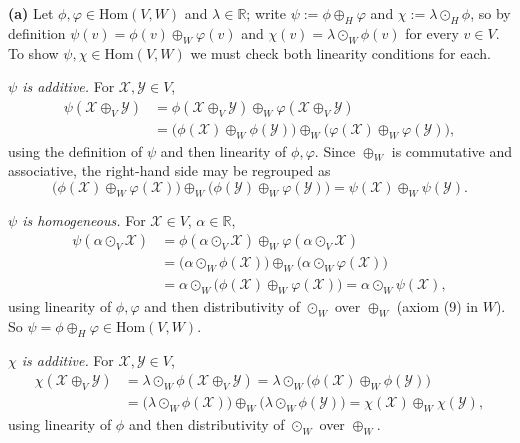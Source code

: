 \documentclass[11pt]{article}
\begin{document}
\textbf{(a)} Let $\phi,\varphi\in\mathrm{Hom}(V,W)$ and $\lambda\in\mathbb R$; write $\psi:=\phi\oplus_H\varphi$ and $\chi:=\lambda\odot_H\phi$, so by definition $\psi(v)=\phi(v)\oplus_W\varphi(v)$ and $\chi(v)=\lambda\odot_W\phi(v)$ for every $v\in V$. To show $\psi,\chi\in\mathrm{Hom}(V,W)$ we must check both linearity conditions for each.

\emph{$\psi$ is additive.} For $\mathcal X,\mathcal Y\in V$,
\begin{align*}
\psi(\mathcal X\oplus_V\mathcal Y) &= \phi(\mathcal X\oplus_V\mathcal Y)\oplus_W\varphi(\mathcal X\oplus_V\mathcal Y) \\
&= \big(\phi(\mathcal X)\oplus_W\phi(\mathcal Y)\big)\oplus_W\big(\varphi(\mathcal X)\oplus_W\varphi(\mathcal Y)\big),
\end{align*}
using the definition of $\psi$ and then linearity of $\phi,\varphi$. Since $\oplus_W$ is commutative and associative, the right-hand side may be regrouped as
\[
\big(\phi(\mathcal X)\oplus_W\varphi(\mathcal X)\big)\oplus_W\big(\phi(\mathcal Y)\oplus_W\varphi(\mathcal Y)\big) = \psi(\mathcal X)\oplus_W\psi(\mathcal Y).
\]

\emph{$\psi$ is homogeneous.} For $\mathcal X\in V$, $\alpha\in\mathbb R$,
\begin{align*}
\psi(\alpha\odot_V\mathcal X) &= \phi(\alpha\odot_V\mathcal X)\oplus_W\varphi(\alpha\odot_V\mathcal X) \\
&= \big(\alpha\odot_W\phi(\mathcal X)\big)\oplus_W\big(\alpha\odot_W\varphi(\mathcal X)\big) \\
&= \alpha\odot_W\big(\phi(\mathcal X)\oplus_W\varphi(\mathcal X)\big) = \alpha\odot_W\psi(\mathcal X),
\end{align*}
using linearity of $\phi,\varphi$ and then distributivity of $\odot_W$ over $\oplus_W$ (axiom (9) in $W$). So $\psi=\phi\oplus_H\varphi\in\mathrm{Hom}(V,W)$.

\emph{$\chi$ is additive.} For $\mathcal X,\mathcal Y\in V$,
\begin{align*}
\chi(\mathcal X\oplus_V\mathcal Y) &= \lambda\odot_W\phi(\mathcal X\oplus_V\mathcal Y) = \lambda\odot_W\big(\phi(\mathcal X)\oplus_W\phi(\mathcal Y)\big) \\
&= \big(\lambda\odot_W\phi(\mathcal X)\big)\oplus_W\big(\lambda\odot_W\phi(\mathcal Y)\big) = \chi(\mathcal X)\oplus_W\chi(\mathcal Y),
\end{align*}
using linearity of $\phi$ and then distributivity of $\odot_W$ over $\oplus_W$.
\end{document}
